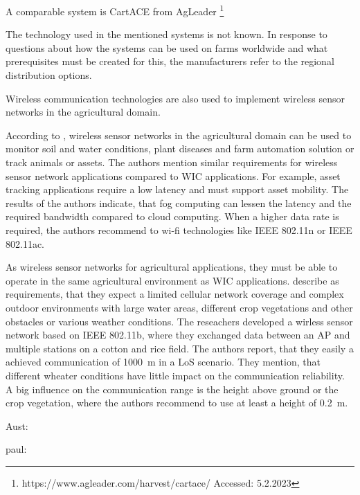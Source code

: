 A comparable system is CartACE from AgLeader \footnote{https://www.agleader.com/harvest/cartace/ Accessed: 5.2.2023}

The technology used in the mentioned systems is not known. In response to questions about how the systems can be used on farms worldwide and what prerequisites must be created for this, the manufacturers refer to the regional distribution options.



Wireless communication technologies are also used to implement wireless sensor networks in the agricultural domain.

According to \textcite{ahmed_internet_2018}, wireless sensor networks in the agricultural domain can be used to monitor soil and water conditions, plant diseases and farm automation solution
or track animals or assets. The authors mention similar requirements for wireless sensor network applications  compared to \ac{WIC} applications.
For example, asset tracking applications require a low latency and must support asset mobility.
The results of the authors indicate, that fog computing can lessen the latency and the required bandwidth compared to cloud computing.
When a higher data rate is required, the authors recommend to wi-fi technologies like IEEE 802.11n or IEEE 802.11ac.

As wireless sensor networks for agricultural applications, they must be able to operate in the same agricultural environment as \ac{WIC} applications.
\textcite{brinkhoff_characterization_2017} describe as requirements, that they expect a limited cellular network coverage and complex outdoor
environments with large water areas, different crop vegetations and other obstacles or various weather conditions. The
reseachers developed a wirless sensor network based on IEEE 802.11b, where they exchanged data between an \ac{AP} and multiple stations on
a cotton and rice field. The authors report, that they easily a achieved communication of \SI{1000}{\metre} in a \ac{LoS} scenario.
They mention, that different wheater conditions have little impact on the communication reliability. A big influence on the communication range is
the height above ground or the crop vegetation, where the authors recommend to use at least a height of \SI{0.2}{\metre}.

Aust:

paul: